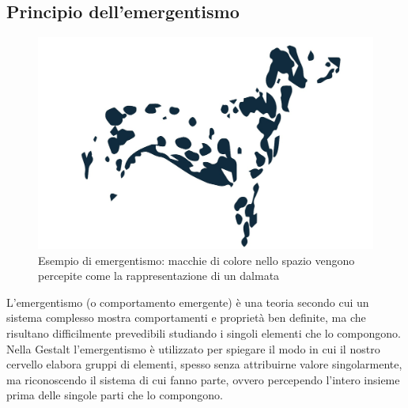 \documentclass[11pt,a4paper]{article}
\begin{document}
\subsection{Principio dell'emergentismo}
\begin{figure}
	\begin{center}
		\includegraphics[scale=0.3]{img/005.png}
	\end{center}
	\caption{Esempio di emergentismo: macchie di colore nello spazio vengono
percepite come la rappresentazione di un dalmata}
\end{figure}
L'emergentismo (o comportamento emergente) è una teoria secondo cui un sistema complesso mostra comportamenti e proprietà ben definite, ma che risultano difficilmente prevedibili studiando i singoli elementi che lo compongono.
Nella Gestalt l'emergentismo è utilizzato per spiegare il modo in cui il nostro cervello elabora gruppi di elementi, spesso senza attribuirne valore singolarmente, ma riconoscendo il sistema di cui fanno parte, ovvero percependo l'intero insieme prima delle singole parti che lo compongono.
\end{document}
